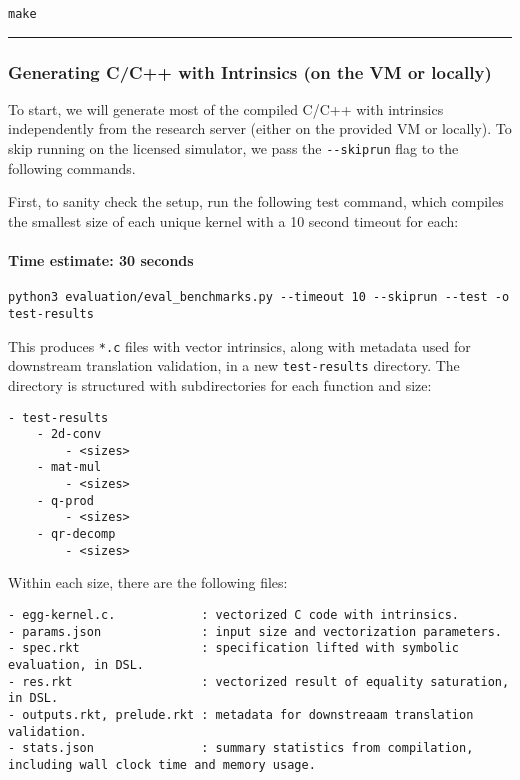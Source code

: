 \begin{verbatim}
make
\end{verbatim}

\begin{center}\rule{0.5\linewidth}{0.5pt}\end{center}

\hypertarget{generating-cc-with-intrinsics-on-the-vm-or-locally}{%
\subsubsection{Generating C/C++ with Intrinsics (on the VM or
locally)}\label{generating-cc-with-intrinsics-on-the-vm-or-locally}}

To start, we will generate most of the compiled C/C++ with intrinsics
independently from the research server (either on the provided VM or
locally). To skip running on the licensed simulator, we pass the
\texttt{-\/-skiprun} flag to the following commands.

First, to sanity check the setup, run the following test command, which
compiles the smallest size of each unique kernel with a 10 second
timeout for each:

\hypertarget{time-estimate-30-seconds}{%
\paragraph{Time estimate: 30 seconds}\label{time-estimate-30-seconds}}

\begin{verbatim}
python3 evaluation/eval_benchmarks.py --timeout 10 --skiprun --test -o test-results
\end{verbatim}

This produces \texttt{*.c} files with vector intrinsics, along with
metadata used for downstream translation validation, in a new
\texttt{test-results} directory. The directory is structured with
subdirectories for each function and size:

\begin{verbatim}
- test-results
    - 2d-conv
        - <sizes>
    - mat-mul
        - <sizes>
    - q-prod
        - <sizes>
    - qr-decomp
        - <sizes>
\end{verbatim}

Within each size, there are the following files:

\begin{verbatim}
- egg-kernel.c.            : vectorized C code with intrinsics.
- params.json              : input size and vectorization parameters.
- spec.rkt                 : specification lifted with symbolic evaluation, in DSL.
- res.rkt                  : vectorized result of equality saturation, in DSL.
- outputs.rkt, prelude.rkt : metadata for downstreaam translation validation.
- stats.json               : summary statistics from compilation, including wall clock time and memory usage.
\end{verbatim}

